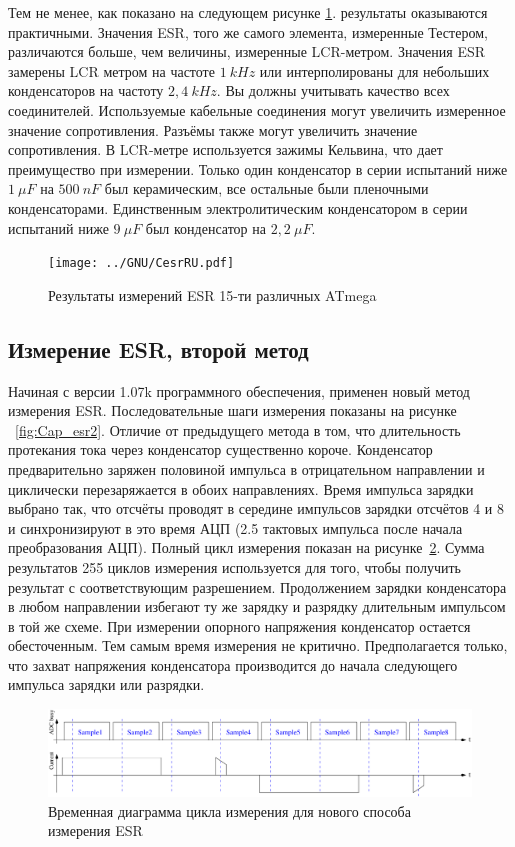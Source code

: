 Тем не менее, как показано на следующем рисунке \ref{fig:Cesr}.
результаты оказываются практичными. Значения ESR, того же самого элемента, измеренные Тестером, различаются больше, 
чем величины, измеренные LCR-метром. Значения ESR замерены LCR метром на частоте \(1~kHz\) или интерполированы для 
небольших конденсаторов на частоту \(2,4~kHz\). Вы должны учитывать качество всех соединителей. Используемые 
кабельные соединения могут увеличить измеренное значение сопротивления. Разъёмы также могут увеличить значение 
сопротивления. В LCR-метре используется зажимы Кельвина, что дает преимущество при измерении. Только один конденсатор 
в серии испытаний ниже \(1~\mu F\) на \(500~nF\) был керамическим, все остальные были пленочными конденсаторами. 
Единственным электролитическим конденсатором в серии испытаний ниже \(9~\mu F\) был конденсатор на \(2,2~\mu F\).

\begin{figure}[H]
\centering
\texttt{[image: ../GNU/CesrRU.pdf]}
\caption{Результаты измерений ESR 15-ти различных ATmega}
\label{fig:Cesr}
\end{figure}


\subsection{Измерение ESR, второй метод}
\label{sec:ESR2}
Начиная с версии 1.07k программного обеспечения, применен новый метод измерения ESR. Последовательные шаги измерения 
показаны на рисунке ~\ref{fig:Cap_esr2}. Отличие от предыдущего метода в том, что длительность протекания тока через 
конденсатор существенно короче. Конденсатор предварительно заряжен половиной импульса в отрицательном направлении и 
циклически перезаряжается в обоих направлениях. Время  импульса зарядки выбрано так, что отсчёты проводят в середине 
импульсов зарядки отсчётов 4 и 8 и синхронизируют в это время АЦП (2.5 тактовых импульса после начала преобразования 
АЦП). Полный цикл измерения показан на рисунке~\ref{fig:Cap_esr2_timing}.
Сумма результатов 255 циклов измерения используется для того, чтобы получить результат с соответствующим разрешением. 
Продолжением зарядки конденсатора в любом направлении избегают ту же зарядку и разрядку длительным импульсом в той 
же схеме. При измерении опорного напряжения конденсатор остается обесточенным. Тем самым время измерения не критично. 
Предполагается только, что захват напряжения конденсатора производится до начала следующего импульса зарядки или 
разрядки. 

\begin{figure}[H]
  \centering
    \includegraphics[width=1.\textwidth]{../FIG/Cap_esr2_timing.pdf}
  \caption{Временная диаграмма цикла измерения для нового способа измерения ESR}
  \label{fig:Cap_esr2_timing}
\end{figure}

